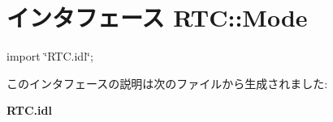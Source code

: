 \section{インタフェース RTC::Mode}
\label{interfaceRTC_1_1Mode}


{\ttfamily import \char`\"{}RTC.idl\char`\"{};}



このインタフェースの説明は次のファイルから生成されました:\begin{DoxyCompactItemize}
\item 
{\bf RTC.idl}\end{DoxyCompactItemize}
